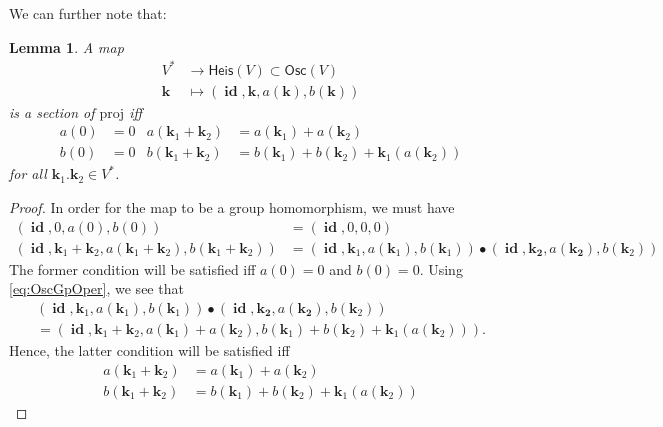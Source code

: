 \documentclass[12pt]{article}
\newcounter{counter}
\theoremstyle{definition}
\theoremstyle{plain}
\newtheorem{lem}[counter]{Lemma}
\newcommand{\id}{\mathop{\mathbf{id}}\nolimits}
\begin{document}
We can further note that:\\

\begin{lem}
    A map
    \begin{align}
     V^{*} &\to \mathsf{Heis}(V) \subset \mathsf{Osc}(V) \\
     \mathbf{k} &\mapsto (\id, \mathbf{k}, a (\mathbf{k}), b(\mathbf{k}))
 \end{align}  
 is a section of \(\mathrm{proj}\) iff
 \begin{align}
     a(0) &= 0 & a (\mathbf{k}_1 + \mathbf{k}_2) &= a (\mathbf{k}_1) + a (\mathbf{k}_2) \label{eq:aconds} \\
      b(0) &= 0 &  b (\mathbf{k}_1 + \mathbf{k}_2) &= b (\mathbf{k}_1) + b (\mathbf{k}_2) + \mathbf{k}_1 (a (\mathbf{k}_2)) \label{eq:bconds}
 \end{align}
 for all \(\mathbf{k}_1. \mathbf{k}_2 \in V^*\).
\end{lem}

\begin{proof}
    In order for the map to be a group homomorphism, we must have
    \begin{align}
        (\id, 0, a (0), b(0)) &= (\id, 0, 0, 0) \\
        (\id, \mathbf{k}_1 + \mathbf{k}_2, a (\mathbf{k}_1 + \mathbf{k}_2), b(\mathbf{k}_1 + \mathbf{k}_2)) &= (\id, \mathbf{k}_1, a (\mathbf{k}_1), b(\mathbf{k}_1)) \bullet (\id, \mathbf{k_2}, a (\mathbf{k_2}), b(\mathbf{k}_2))
    \end{align}
    The former condition will be satisfied iff \(a(0) = 0\) and \(b(0) = 0\).  Using \autoref{eq:OscGpOper}, we see that
    \begin{multline}
        (\id, \mathbf{k}_1, a(\mathbf{k}_1), b (\mathbf{k}_1)) \bullet (\id, \mathbf{k_2}, a(\mathbf{k_2}), b(\mathbf{k}_2)) \\ = (\id, \mathbf{k}_1 + \mathbf{k}_2, a(\mathbf{k}_1) + a(\mathbf{k}_2), b (\mathbf{k}_1) + b (\mathbf{k}_2) + \mathbf{k}_1 (a(\mathbf{k}_2))).
    \end{multline}
    Hence, the latter condition will be satisfied iff
    \begin{align}
        a (\mathbf{k}_1 + \mathbf{k}_2) &= a (\mathbf{k}_1) + a (\mathbf{k}_2) \\
        b (\mathbf{k}_1 + \mathbf{k}_2) &= b (\mathbf{k}_1) + b (\mathbf{k}_2) + \mathbf{k}_1 (a(\mathbf{k}_2)) 
    \end{align}
\end{proof}
\end{document}
